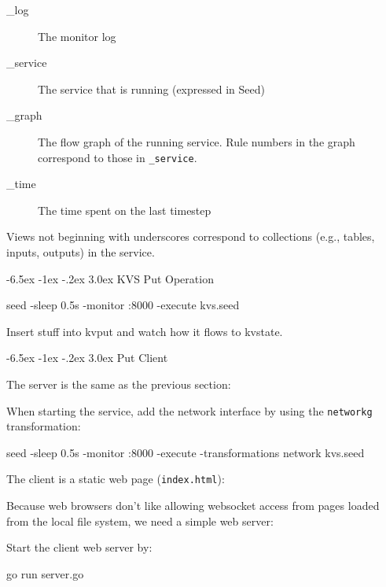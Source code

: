 \documentclass[a5paper,12pt,onecolumn]{article}
\makeatletter
\def\code#1{\mbox{\lstinline{#1}}}
\renewcommand\section{\@startsection {section}{1}{\z@}%
	{-6.5ex \@plus -1ex \@minus -.2ex}%
	{3.0ex}%
	{\sf\Large}}
\makeatother
\begin{document}
\begin{description}
\item[\_log] The monitor log
\item[\_service] The service that is running (expressed in Seed)
\item[\_graph] The flow graph of the running service. Rule numbers in the graph correspond to those in \code{_service}.
\item[\_time] The time spent on the last timestep
\end{description}

Views not beginning with underscores correspond to collections (e.g., tables, inputs, outputs) in the service.

\section{KVS Put Operation}



\begin{cli}
seed -sleep 0.5s -monitor :8000 -execute kvs.seed
\end{cli}

Insert stuff into kvput and watch how it flows to kvstate.

\section{Put Client}

The server is the same as the previous section:



When starting the service, add the network interface by using the \code{networkg} transformation:

\begin{cli}
seed -sleep 0.5s -monitor :8000 -execute -transformations network kvs.seed
\end{cli}

The client is a static web page (\code{index.html}):



Because web browsers don't like allowing websocket access from pages loaded from the local file system, we need a simple web server:



Start the client web server by:

\begin{cli}
go run server.go
\end{cli}
\end{document}
